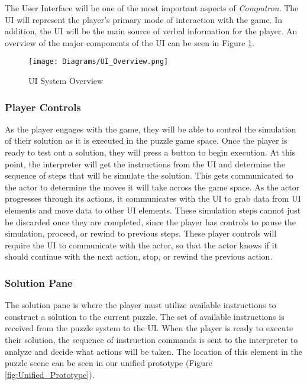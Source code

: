 The User Interface will be one of the most important aspects of \textit{Computron}. The UI will represent the player's primary mode of interaction with the game. In addition, the UI will be the main source of verbal information for the player. An overview of the major components of the UI can be seen in Figure \ref{fig:ui_sytem_diagram}.

\begin{figure}[!hb]
    \caption{UI System Overview}
    \label{fig:ui_sytem_diagram}
    \centering
    \texttt{[image: Diagrams/UI\_Overview.png]}
\end{figure}

\subsubsection{Player Controls}

As the player engages with the game, they will be able to control the simulation of their solution as it is executed in the puzzle game space. Once the player is ready to test out a solution, they will press a button to begin execution. At this point, the interpreter will get the instructions from the UI and determine the sequence of steps that will be simulate the solution. This gets communicated to the actor to determine the moves it will take across the game space. As the actor progresses through its actions, it communicates with the UI to grab data from UI elements and move data to other UI elements. These simulation steps cannot just be discarded once they are completed, since the player has controls to pause the simulation, proceed, or rewind to previous steps. These player controls will require the UI to communicate with the actor, so that the actor knows if it should continue with the next action, stop, or rewind the previous action.

\subsubsection{Solution Pane}

The solution pane is where the player must utilize available instructions to construct a solution to the current puzzle. The set of available instructions is received from the puzzle system to the UI. When the player is ready to execute their solution, the sequence of instruction commands is sent to the interpreter to analyze and decide what actions will be taken. The location of this element in the puzzle scene can be seen in our unified prototype (Figure \ref{fig:Unified_Prototype}).

